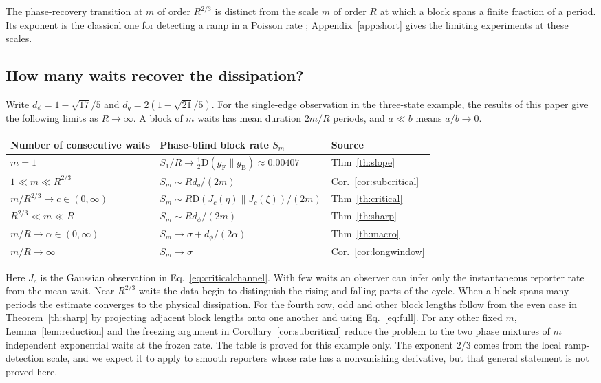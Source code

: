 \documentclass[11pt,a4paper]{article}
\newcommand{\KL}{\mathrm D}
\newcommand{\F}{\mathrm F}
\newcommand{\B}{\mathrm B}
\begin{document}
The phase-recovery transition at $m$ of order $R^{2/3}$ is distinct from the scale $m$ of order $R$ at which a block spans a finite fraction of a period. Its exponent is the classical one for detecting a ramp in a Poisson rate \cite{mora}; Appendix~\ref{app:short} gives the limiting experiments at these scales.

\subsection*{How many waits recover the dissipation?}
Write $d_\phi=1-\sqrt{17}/5$ and $d_q=2(1-\sqrt{21}/5)$. For the single-edge observation in the three-state example, the results of this paper give the following limits as $R\to\infty$. A block of $m$ waits has mean duration $2m/R$ periods, and $a\ll b$ means $a/b\to0$.
\begin{center}
\begin{tabular}{@{}lll@{}}\toprule
Number of consecutive waits & Phase-blind block rate $S_m$ & Source\\\midrule
$m=1$ & $S_1/R\to\tfrac12\KL(g_\F\|g_\B)\approx0.00407$ & Thm~\ref{th:slope}\\
$1\ll m\ll R^{2/3}$ & $S_m\sim R d_q/(2m)$ & Cor.~\ref{cor:subcritical}\\
$m/R^{2/3}\to c\in(0,\infty)$ & $S_m\sim R\KL(J_c(\eta)\|J_c(\xi))/(2m)$ & Thm~\ref{th:critical}\\
$R^{2/3}\ll m\ll R$ & $S_m\sim R d_\phi/(2m)$ & Thm~\ref{th:sharp}\\
$m/R\to\alpha\in(0,\infty)$ & $S_m\to\sigma+d_\phi/(2\alpha)$ & Thm~\ref{th:macro}\\
$m/R\to\infty$ & $S_m\to\sigma$ & Cor.~\ref{cor:longwindow}\\\bottomrule
\end{tabular}
\end{center}
Here $J_c$ is the Gaussian observation in Eq.~\eqref{eq:criticalchannel}. With few waits an observer can infer only the instantaneous reporter rate from the mean wait. Near $R^{2/3}$ waits the data begin to distinguish the rising and falling parts of the cycle. When a block spans many periods the estimate converges to the physical dissipation. For the fourth row, odd and other block lengths follow from the even case in Theorem~\ref{th:sharp} by projecting adjacent block lengths onto one another and using Eq.~\eqref{eq:full}. For any other fixed $m$, Lemma~\ref{lem:reduction} and the freezing argument in Corollary~\ref{cor:subcritical} reduce the problem to the two phase mixtures of $m$ independent exponential waits at the frozen rate. The table is proved for this example only. The exponent $2/3$ comes from the local ramp-detection scale, and we expect it to apply to smooth reporters whose rate has a nonvanishing derivative, but that general statement is not proved here.
\end{document}
